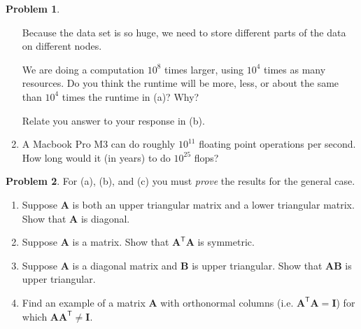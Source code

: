 \documentclass[12pt]{article}
\theoremstyle{definition}
\newtheorem{problem}{Problem}
\renewcommand{\vec}{\mathbf}
\newcommand{\T}{\mathsf{T}}
\begin{document}
\begin{problem}
\begin{enumerate}
            Because the data set is so huge, we need to store different parts of the data on different nodes. 

            We are doing a computation $10^8$ times larger, using $10^4$ times as many resources.
            Do you think the runtime will be more, less, or about the same than $10^4$ times the runtime in (a)? Why?

            Relate you answer to your response in (b).
        \item  A Macbook Pro M3 can do roughly $10^{11}$ floating point operations per second. How long would it (in years) to do $10^{25}$ flops? 
    \end{enumerate}
\end{problem}


\vfill
\begin{problem}For (a), (b), and (c) you must \emph{prove} the results for the general case. 
    \begin{enumerate}
        \item Suppose $\vec{A}$ is both an upper triangular matrix and a lower triangular matrix. Show that $\vec{A}$ is diagonal.
        \item Suppose $\vec{A}$ is a matrix. Show that $\vec{A}^\T \vec{A}$ is symmetric.
        \item Suppose $\vec{A}$ is a diagonal matrix and $\vec{B}$ is upper triangular. Show that $\vec{A}\vec{B}$ is upper triangular.
        \item Find an example of a matrix $\vec{A}$ with orthonormal columns (i.e. $\vec{A}^\T \vec{A} = \vec{I}$) for which $\vec{A}\vec{A}^\T \neq \vec{I}$. 
    \end{enumerate}
\end{problem}
\end{document}
